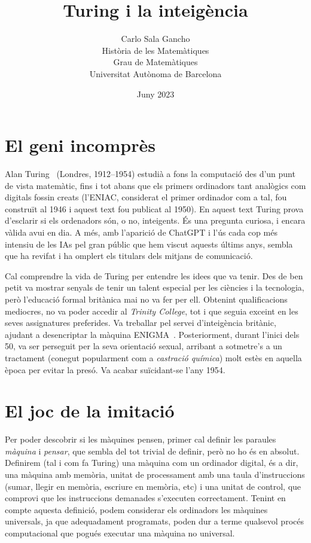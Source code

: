 \documentclass[a4paper, 11pt]{article}
\title{Turing i la inte\lgem{}igència}
\author{
  Carlo Sala Gancho\\
  Història de les Matemàtiques\\
  Grau de Matemàtiques\\
  Universitat Autònoma de Barcelona } \date{Juny 2023}
\begin{document}
\frenchspacing

\pagestyle{fancy}
\fancyhf{}
\fancyfoot[C]{\thepage}

\maketitle

\section*{El geni incomprès}

Alan Turing~\cite{bib:wiki:turing} (Londres, 1912--1954) estudià a fons la computació des d'un punt de vista matemàtic,
fins i tot abans que els primers ordinadors tant analògics com digitals fossin creats (l'ENIAC, considerat el primer
ordinador com a tal, fou construït al 1946 i aquest text fou publicat al 1950). En aquest text Turing prova d'esclarir
si els ordenadors són, o no, inte\lgem{}igents. És una pregunta curiosa, i encara vàlida avui en dia. A més, amb
l'aparició de ChatGPT i l'ús cada cop més intensiu de les IAs pel gran públic que hem viscut aquests últims anys,
sembla que ha revifat i ha omplert els titulars dels mitjans de comunicació.

Cal comprendre la vida de Turing per entendre les idees que va tenir. Des de ben petit va mostrar senyals de tenir un
talent especial per les ciències i la tecnologia, però l'educació formal britànica mai no va fer per ell. Obtenint
qualificacions mediocres, no va poder accedir al \textit{Trinity College}, tot i que seguia exce\lgem{}int en les seves
assignatures preferides. Va treballar pel servei d'inte\lgem{}igència britànic, ajudant a desencriptar la màquina
ENIGMA~\cite{bib:wiki:enigma}. Posteriorment, durant l'inici dels 50, va ser perseguit per la seva orientació sexual,
arribant a sotmetre's a un tractament (conegut popularment com a \textit{castració química}) molt estès en aquella
època per evitar la presó. Va acabar suïcidant-se l'any 1954.

\section*{El joc de la imitació}

Per poder descobrir si les màquines pensen, primer cal definir les paraules \textit{màquina} i \textit{pensar}, que
sembla del tot trivial de definir, però no ho és en absolut. Definirem (tal i com fa Turing) una màquina com un
ordinador digital, és a dir, una màquina amb memòria, unitat de processament amb una taula d'instruccions (sumar,
llegir en memòria, escriure en memòria, etc) i una unitat de control, que comprovi que les instruccions demanades
s'executen correctament. Tenint en compte aquesta definició, podem considerar els ordinadors les màquines universals,
ja que adequadament programats, poden dur a terme qualsevol procés computacional que pogués executar una màquina no
universal.
\end{document}

